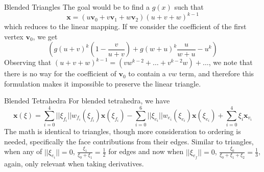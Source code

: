 \documentclass[12pt]{beamer}
\begin{document}
\begin{frame}{Blended Triangles}
The goal would be to find a $g(x)$ such that 
\[\mathbf{x} = (u\mathbf{v}_0+v\mathbf{v}_1+w\mathbf{v}_2)(u+v+w)^{k-1} \]
which reduces to the linear mapping. If we consider the coefficient of the first vertex $\mathbf{v}_0$, we get
\[\left(g(u+v)^k\left(1-\frac{v}{u+v}\right)+g(w+u)^k\frac{u}{w+u}-u^k\right)\]
Observing that $ (u+v+w)^{k-1} = (vw^{k-2}+\ldots+v^{k-2}w) + \ldots$, we note that there is no way for the coefficient of $\mathbf{v}_0$ to contain a $vw$ term, and therefore this formulation makes it impossible to preserve the linear triangle.
\end{frame}
\begin{frame}{Blended Tetrahedra}
For blended tetrahedra, we have
\[\mathbf{x}(\xi) = \sum_{i=0}^{4}||\xi_{f_i}||w_{f_i}(\xi_{f_i})\mathbf{x}(\xi_{f_i}) - \sum_{i=0}^{6}||\xi_{e_i}||w_{e_i}(\xi_{e_i})\mathbf{x}(\xi_{e_i}) + \sum_{i=0}^{4}\xi_i\mathbf{x}_{v_i}\]
The math is identical to triangles, though more consideration to ordering is needed, specifically the face contributions from their edges.
Similar to triangles, when any of $||\xi_{e_i}|| = 0$, $\frac{\xi_1}{\xi_0+\xi_1} = \frac{1}{2}$ for edges and now when $||\xi_{e_f}|| = 0$, $\frac{\xi_0}{\xi_0+\xi_1+\xi_2} = \frac{1}{3}$, again, only relevant when taking derivatives.
\end{frame}
\end{document}
